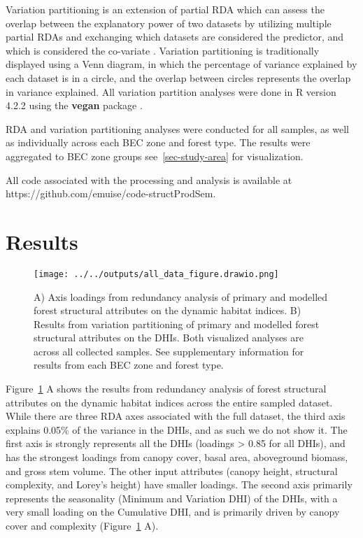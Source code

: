 \documentclass[
  authoryear,
  review,
  3p,
  twocolumn]{elsarticle}
\begin{document}
Variation partitioning is an extension of partial RDA which can assess
the overlap between the explanatory power of two datasets by utilizing
multiple partial RDAs and exchanging which datasets are considered the
predictor, and which is considered the co-variate \citep{legendre2012}.
Variation partitioning is traditionally displayed using a Venn diagram,
in which the percentage of variance explained by each dataset is in a
circle, and the overlap between circles represents the overlap in
variance explained. All variation partition analyses were done in R
\citep{R-base} version 4.2.2 using the \textbf{vegan} package
\citep{R-vegan}.

RDA and variation partitioning analyses were conducted for all samples,
as well as individually across each BEC zone and forest type. The
results were aggregated to BEC zone groups see~\ref{sec-study-area} for
visualization.

All code associated with the processing and analysis is available at
https://github.com/emuise/code-structProdSem.

\hypertarget{results}{%
\section{Results}\label{results}}

\begin{figure}

{\centering \texttt{[image: ../../outputs/all\_data\_figure.drawio.png]}

}

\caption{\label{fig-rda-var}A) Axis loadings from redundancy analysis of
primary and modelled forest structural attributes on the dynamic habitat
indices. B) Results from variation partitioning of primary and modelled
forest structural attributes on the DHIs. Both visualized analyses are
across all collected samples. See supplementary information for results
from each BEC zone and forest type.}

\end{figure}

Figure~\ref{fig-rda-var} A shows the results from redundancy analysis of
forest structural attributes on the dynamic habitat indices across the
entire sampled dataset. While there are three RDA axes associated with
the full dataset, the third axis explains 0.05\% of the variance in the
DHIs, and as such we do not show it. The first axis is strongly
represents all the DHIs (loadings \textgreater{} 0.85 for all DHIs), and
has the strongest loadings from canopy cover, basal area, aboveground
biomass, and gross stem volume. The other input attributes (canopy
height, structural complexity, and Lorey's height) have smaller
loadings. The second axis primarily represents the seasonality (Minimum
and Variation DHI) of the DHIs, with a very small loading on the
Cumulative DHI, and is primarily driven by canopy cover and complexity
(Figure~\ref{fig-rda-var} A).
\end{document}
